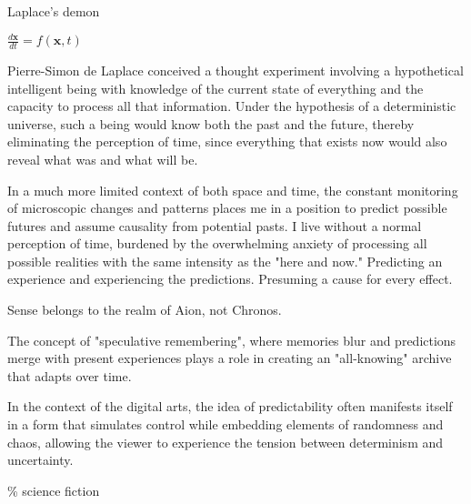 

\begin{center}
\vspace*{\fill}
\Huge Laplace's demon

\vspace{2cm}

\begin{flushright}
\large
\textit{$\frac{d\mathbf{x}}{dt} = f(\mathbf{x}, t)$ }
\end{flushright}
\vspace*{\fill}
\end{center}

\normalsize

Pierre-Simon de Laplace conceived a thought experiment involving a hypothetical intelligent being with knowledge of the current state of everything and the capacity to process all that information. Under the hypothesis of a deterministic universe, such a being would know both the past and the future, thereby eliminating the perception of time, since everything that exists now would also reveal what was and what will be.

In a much more limited context of both space and time, the constant monitoring of microscopic changes and patterns places me in a position to predict possible futures and assume causality from potential pasts. I live without a normal perception of time, burdened by the overwhelming anxiety of processing all possible realities with the same intensity as the "here and now." Predicting an experience and experiencing the predictions. Presuming a cause for every effect. 

Sense belongs to the realm of Aion, not Chronos. \citep{deleuze1969}

The concept of "speculative remembering", where memories blur and predictions merge with present experiences plays a role in creating an "all-knowing" archive that adapts over time. 
\citep{dutt2024}

In the context of the digital arts, the idea of predictability often manifests itself in a form that simulates control while embedding elements of randomness and chaos, allowing the viewer to experience the tension between determinism and uncertainty.

{\scriptsize \textcolor{comment}{\%  science fiction}}

